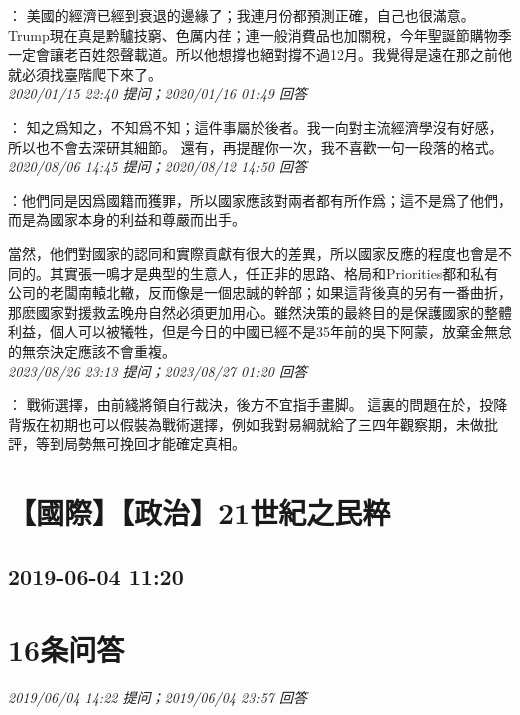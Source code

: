 \documentclass[twocolumn]{ctexart}
\begin{document}
：
美國的經濟已經到衰退的邊緣了；我連月份都預測正確，自己也很滿意。
Trump現在真是黔驢技窮、色厲内荏；連一般消費品也加關稅，今年聖誕節購物季一定會讓老百姓怨聲載道。所以他想撐也絕對撐不過12月。我覺得是遠在那之前他就必須找臺階爬下來了。
\\

\textit{\hfill\noindent\small 2020/01/15 22:40 提问；2020/01/16 01:49 回答}

：
知之爲知之，不知爲不知；這件事屬於後者。我一向對主流經濟學沒有好感，所以也不會去深研其細節。 
還有，再提醒你一次，我不喜歡一句一段落的格式。
\\

\textit{\hfill\noindent\small 2020/08/06 14:45 提问；2020/08/12 14:50 回答}

：他們同是因爲國籍而獲罪，所以國家應該對兩者都有所作爲；這不是爲了他們，而是為國家本身的利益和尊嚴而出手。

當然，他們對國家的認同和實際貢獻有很大的差異，所以國家反應的程度也會是不同的。其實張一鳴才是典型的生意人，任正非的思路、格局和Priorities都和私有公司的老闆南轅北轍，反而像是一個忠誠的幹部；如果這背後真的另有一番曲折，那麽國家對援救孟晚舟自然必須更加用心。雖然決策的最終目的是保護國家的整體利益，個人可以被犧牲，但是今日的中國已經不是35年前的吳下阿蒙，放棄金無怠的無奈決定應該不會重複。
\\

\textit{\hfill\noindent\small 2023/08/26 23:13 提问；2023/08/27 01:20 回答}

：
戰術選擇，由前綫將領自行裁決，後方不宜指手畫脚。
這裏的問題在於，投降背叛在初期也可以假裝為戰術選擇，例如我對易綱就給了三四年觀察期，未做批評，等到局勢無可挽回才能確定真相。
\\


\section{【國際】【政治】21世紀之民粹}
\subsection{2019-06-04 11:20}


\section{16条问答}

\textit{\hfill\noindent\small 2019/06/04 14:22 提问；2019/06/04 23:57 回答}
\end{document}
